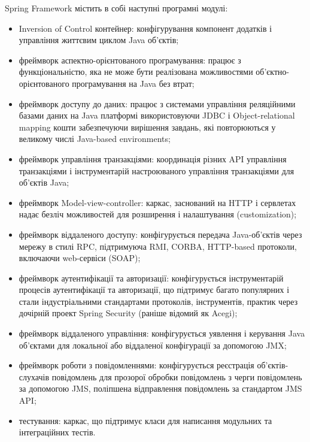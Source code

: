 \par Spring Framework містить в собі наступні програмні модулі:
\begin{itemize}
\item Inversion of Control контейнер: конфігурування компонент додатків і управління життєвим циклом Java об'єктів;
\item фреймворк аспектно-орієнтованого програмування: працює з функціональністю, яка не може бути реалізована можливостями об'єктно-орієнтованого програмування на Java без втрат;
\item фреймворк доступу до даних: працює з системами управління реляційними базами даних на Java платформі використовуючи JDBC і Object-relational mapping кошти забезпечуючи вирішення завдань, які повторюються у великому числі Java-based environments;
\item фреймворк управління транзакціями: координація різних API управління транзакціями і інструментарій настроюваного управління транзакціями для об'єктів Java;
\item фреймворк Model-view-controller: каркас, заснований на HTTP і сервлетах надає безліч можливостей для розширення і налаштування (customization);
\item фреймворк віддаленого доступу: конфігурується передача Java-об'єктів через мережу в стилі RPC, підтримуюча RMI, CORBA, HTTP-based протоколи, включаючи web-сервіси (SOAP);
\item фреймворк аутентифікації та авторизації: конфігурується інструментарій процесів аутентифікації та авторизації, що підтримує багато популярних і стали індустріальними стандартами протоколів, інструментів, практик через дочірній проект Spring Security (раніше відомий як Acegi);
\item фреймворк віддаленого управління: конфігурується уявлення і керування Java об'єктами для локальної або віддаленої конфігурації за допомогою JMX;
\item фреймворк роботи з повідомленнями: конфігурується реєстрація об'єктів-слухачів повідомлень для прозорої обробки повідомлень з черги повідомлень за допомогою JMS, поліпшена відправлення повідомлень за стандартом JMS API;
\item тестування: каркас, що підтримує класи для написання модульних та інтеграційних тестів.
\end{itemize}

